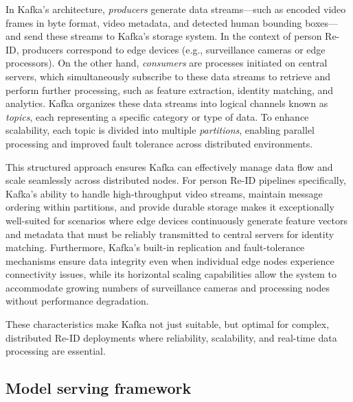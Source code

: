 \documentclass[../main.tex]{subfiles}
\begin{document}
In Kafka's architecture, \textit{producers} generate data streams—such as encoded video frames in byte format, video metadata, and detected human bounding boxes—and send these streams to Kafka's storage system. In the context of person Re-ID, producers correspond to edge devices (e.g., surveillance cameras or edge processors). On the other hand, \textit{consumers} are processes initiated on central servers, which simultaneously subscribe to these data streams to retrieve and perform further processing, such as feature extraction, identity matching, and analytics. Kafka organizes these data streams into logical channels known as \textit{topics}, each representing a specific category or type of data. To enhance scalability, each topic is divided into multiple \textit{partitions}, enabling parallel processing and improved fault tolerance across distributed environments. 

This structured approach ensures Kafka can effectively manage data flow and scale seamlessly across distributed nodes. For person Re-ID pipelines specifically, Kafka's ability to handle high-throughput video streams, maintain message ordering within partitions, and provide durable storage makes it exceptionally well-suited for scenarios where edge devices continuously generate feature vectors and metadata that must be reliably transmitted to central servers for identity matching. Furthermore, Kafka's built-in replication and fault-tolerance mechanisms ensure data integrity even when individual edge nodes experience connectivity issues, while its horizontal scaling capabilities allow the system to accommodate growing numbers of surveillance cameras and processing nodes without performance degradation. 

These characteristics make Kafka not just suitable, but optimal for complex, distributed Re-ID deployments where reliability, scalability, and real-time data processing are essential.

\subsection{Model serving framework}
\label{sec:model_serving_framework}
\end{document}
